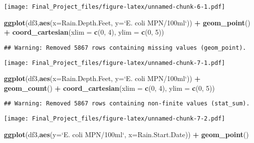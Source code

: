 \documentclass[
]{article}
\newenvironment{Shaded}{\begin{snugshade}}{\end{snugshade}}
\newcommand{\DataTypeTok}[1]{\textcolor[rgb]{0.13,0.29,0.53}{#1}}
\newcommand{\DecValTok}[1]{\textcolor[rgb]{0.00,0.00,0.81}{#1}}
\newcommand{\KeywordTok}[1]{\textcolor[rgb]{0.13,0.29,0.53}{\textbf{#1}}}
\newcommand{\NormalTok}[1]{#1}
\newcommand{\OperatorTok}[1]{\textcolor[rgb]{0.81,0.36,0.00}{\textbf{#1}}}
\newcommand{\StringTok}[1]{\textcolor[rgb]{0.31,0.60,0.02}{#1}}
\begin{document}
\texttt{[image: Final\_Project\_files/figure-latex/unnamed-chunk-6-1.pdf]}

\begin{Shaded}
\begin{Highlighting}[]
\KeywordTok{ggplot}\NormalTok{(df3,}\KeywordTok{aes}\NormalTok{(}\DataTypeTok{x=}\NormalTok{Rain.Depth.Feet, }\DataTypeTok{y=}\StringTok{`}\DataTypeTok{E. coli MPN/100ml}\StringTok{`}\NormalTok{)) }\OperatorTok{+}
\StringTok{  }\KeywordTok{geom_point}\NormalTok{() }\OperatorTok{+}\StringTok{ }\KeywordTok{coord_cartesian}\NormalTok{(}\DataTypeTok{xlim =} \KeywordTok{c}\NormalTok{(}\DecValTok{0}\NormalTok{, }\DecValTok{4}\NormalTok{), }\DataTypeTok{ylim =} \KeywordTok{c}\NormalTok{(}\DecValTok{0}\NormalTok{, }\DecValTok{5}\NormalTok{))}
\end{Highlighting}
\end{Shaded}

\begin{verbatim}
## Warning: Removed 5867 rows containing missing values (geom_point).
\end{verbatim}

\texttt{[image: Final\_Project\_files/figure-latex/unnamed-chunk-7-1.pdf]}

\begin{Shaded}
\begin{Highlighting}[]
\KeywordTok{ggplot}\NormalTok{(df3,}\KeywordTok{aes}\NormalTok{(}\DataTypeTok{x=}\NormalTok{Rain.Depth.Feet, }\DataTypeTok{y=}\StringTok{`}\DataTypeTok{E. coli MPN/100ml}\StringTok{`}\NormalTok{)) }\OperatorTok{+}
\StringTok{  }\KeywordTok{geom_count}\NormalTok{() }\OperatorTok{+}\StringTok{ }\KeywordTok{coord_cartesian}\NormalTok{(}\DataTypeTok{xlim =} \KeywordTok{c}\NormalTok{(}\DecValTok{0}\NormalTok{, }\DecValTok{4}\NormalTok{), }\DataTypeTok{ylim =} \KeywordTok{c}\NormalTok{(}\DecValTok{0}\NormalTok{, }\DecValTok{5}\NormalTok{))}
\end{Highlighting}
\end{Shaded}

\begin{verbatim}
## Warning: Removed 5867 rows containing non-finite values (stat_sum).
\end{verbatim}

\texttt{[image: Final\_Project\_files/figure-latex/unnamed-chunk-7-2.pdf]}

\begin{Shaded}
\begin{Highlighting}[]
\KeywordTok{ggplot}\NormalTok{(df3,}\KeywordTok{aes}\NormalTok{(}\DataTypeTok{y=}\StringTok{`}\DataTypeTok{E. coli MPN/100ml}\StringTok{`}\NormalTok{, }\DataTypeTok{x=}\NormalTok{Rain.Start.Date)) }\OperatorTok{+}\StringTok{ }\KeywordTok{geom_point}\NormalTok{()}
\end{Highlighting}
\end{Shaded}
\end{document}
